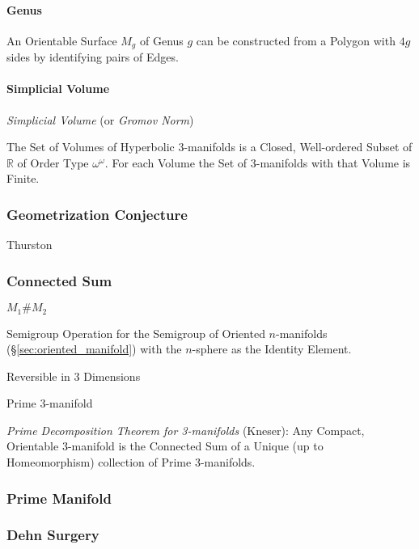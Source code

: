 \paragraph{Genus}\label{sec:genus}\hfill

An Orientable Surface $M_g$ of Genus $g$ can be constructed from a
Polygon with $4g$ sides by identifying pairs of Edges.



\paragraph{Simplicial Volume}\label{sec:simplicial_volume}\hfill

\emph{Simplicial Volume} (or \emph{Gromov Norm})

The Set of Volumes of Hyperbolic 3-manifolds is a Closed, Well-ordered
Subset of $\mathbb{R}$ of Order Type $\omega^\omega$. For each Volume
the Set of 3-manifolds with that Volume is Finite.



\subsubsection{Geometrization Conjecture}
\label{sec:geometrization_conjecture}

Thurston



\subsubsection{Connected Sum}\label{sec:connected_sum}

$M_1 \# M_2$

Semigroup Operation for the Semigroup of Oriented $n$-manifolds
(\S\ref{sec:oriented_manifold}) with the $n$-sphere as the Identity Element.

Reversible in 3 Dimensions

Prime 3-manifold

\emph{Prime Decomposition Theorem for 3-manifolds} (Kneser): Any Compact,
Orientable 3-manifold is the Connected Sum of a Unique (up to Homeomorphism)
collection of Prime 3-manifolds.



\subsubsection{Prime Manifold}\label{sec:prime_manifold}

\subsubsection{Dehn Surgery}\label{sec:dehn_surgery}

